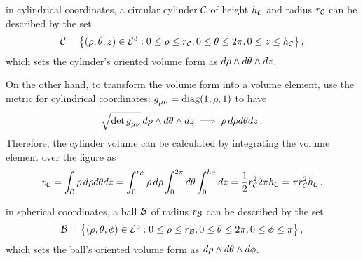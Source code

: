  in cylindrical coordinates, a circular cylinder $\mathcal{C}$ of height $h_{\mathcal{C}}$ and radius $r_{\mathcal{C}}$ can be described by the set
%
\begin{equation*}
  \cyl = \desset{\tuple{\cxpos,\cypos,\czpos}\in\nespace 3}
                {0\leq\cxpos\leq\radius_\cyl,
                 0\leq\cypos\leq 2\pi,
                 0\leq\czpos\leq\height_\cyl
                }\,,
\end{equation*}
%
which sets the cylinder's oriented volume form as $d\rho\wedge d\theta\wedge dz$. 

On the other hand, to transform the volume form into a volume element, use the metric for cylindrical coordinates: $\tmetric\mu\nu = \diag\vat{1,\cxpos,1}$ to have
%
\begin{equation*}
  \sqrt{\det\tmetric\mu\nu}\,d\cxpos\oprod d\cypos\oprod d\czpos \implies
    \cxpos\,d\cxpos d\cypos d\czpos\,.
\end{equation*}
%
Therefore, the cylinder volume can be calculated by integrating the volume element over the figure as
%
\begin{equation*}
  v_{\mathcal{C}} = \int_{\mathcal{C}}\rho\,d\rho d\theta dz
               = \int_{0}^{r_{\mathcal{C}}}\rho\,d\rho \int_{0}^{2\pi}d\theta \int_{0}^{h_{\mathcal{C}}}dz 
               = \dfrac 12 r_{\mathcal{C}}^2 2\pi h_{\mathcal{C}}
               = \pi r_{\mathcal{C}}^2h_{\mathcal{C}}\,.
\end{equation*}

 in spherical coordinates, a ball $\mathcal{B}$ of radius $r_{\mathcal{B}}$ can be described by the set
%
\begin{equation*}
  \ball = \desset{\tuple{\sxpos,\sypos,\szpos}\in\nespace 3}
                 {0\leq\sxpos\leq\radius_\ball,
                  0\leq\sypos\leq 2\pi,
                  0\leq\szpos\leq \pi
                  }\,,
\end{equation*}
%
which sets the ball's oriented volume form as $d\rho\wedge d\theta\wedge d\phi$. 

